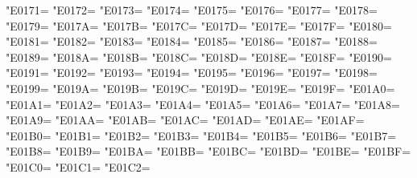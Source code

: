 \XeTeXcharclass"E0171=\KclassCM
\XeTeXcharclass"E0172=\KclassCM
\XeTeXcharclass"E0173=\KclassCM
\XeTeXcharclass"E0174=\KclassCM
\XeTeXcharclass"E0175=\KclassCM
\XeTeXcharclass"E0176=\KclassCM
\XeTeXcharclass"E0177=\KclassCM
\XeTeXcharclass"E0178=\KclassCM
\XeTeXcharclass"E0179=\KclassCM
\XeTeXcharclass"E017A=\KclassCM
\XeTeXcharclass"E017B=\KclassCM
\XeTeXcharclass"E017C=\KclassCM
\XeTeXcharclass"E017D=\KclassCM
\XeTeXcharclass"E017E=\KclassCM
\XeTeXcharclass"E017F=\KclassCM
\XeTeXcharclass"E0180=\KclassCM
\XeTeXcharclass"E0181=\KclassCM
\XeTeXcharclass"E0182=\KclassCM
\XeTeXcharclass"E0183=\KclassCM
\XeTeXcharclass"E0184=\KclassCM
\XeTeXcharclass"E0185=\KclassCM
\XeTeXcharclass"E0186=\KclassCM
\XeTeXcharclass"E0187=\KclassCM
\XeTeXcharclass"E0188=\KclassCM
\XeTeXcharclass"E0189=\KclassCM
\XeTeXcharclass"E018A=\KclassCM
\XeTeXcharclass"E018B=\KclassCM
\XeTeXcharclass"E018C=\KclassCM
\XeTeXcharclass"E018D=\KclassCM
\XeTeXcharclass"E018E=\KclassCM
\XeTeXcharclass"E018F=\KclassCM
\XeTeXcharclass"E0190=\KclassCM
\XeTeXcharclass"E0191=\KclassCM
\XeTeXcharclass"E0192=\KclassCM
\XeTeXcharclass"E0193=\KclassCM
\XeTeXcharclass"E0194=\KclassCM
\XeTeXcharclass"E0195=\KclassCM
\XeTeXcharclass"E0196=\KclassCM
\XeTeXcharclass"E0197=\KclassCM
\XeTeXcharclass"E0198=\KclassCM
\XeTeXcharclass"E0199=\KclassCM
\XeTeXcharclass"E019A=\KclassCM
\XeTeXcharclass"E019B=\KclassCM
\XeTeXcharclass"E019C=\KclassCM
\XeTeXcharclass"E019D=\KclassCM
\XeTeXcharclass"E019E=\KclassCM
\XeTeXcharclass"E019F=\KclassCM
\XeTeXcharclass"E01A0=\KclassCM
\XeTeXcharclass"E01A1=\KclassCM
\XeTeXcharclass"E01A2=\KclassCM
\XeTeXcharclass"E01A3=\KclassCM
\XeTeXcharclass"E01A4=\KclassCM
\XeTeXcharclass"E01A5=\KclassCM
\XeTeXcharclass"E01A6=\KclassCM
\XeTeXcharclass"E01A7=\KclassCM
\XeTeXcharclass"E01A8=\KclassCM
\XeTeXcharclass"E01A9=\KclassCM
\XeTeXcharclass"E01AA=\KclassCM
\XeTeXcharclass"E01AB=\KclassCM
\XeTeXcharclass"E01AC=\KclassCM
\XeTeXcharclass"E01AD=\KclassCM
\XeTeXcharclass"E01AE=\KclassCM
\XeTeXcharclass"E01AF=\KclassCM
\XeTeXcharclass"E01B0=\KclassCM
\XeTeXcharclass"E01B1=\KclassCM
\XeTeXcharclass"E01B2=\KclassCM
\XeTeXcharclass"E01B3=\KclassCM
\XeTeXcharclass"E01B4=\KclassCM
\XeTeXcharclass"E01B5=\KclassCM
\XeTeXcharclass"E01B6=\KclassCM
\XeTeXcharclass"E01B7=\KclassCM
\XeTeXcharclass"E01B8=\KclassCM
\XeTeXcharclass"E01B9=\KclassCM
\XeTeXcharclass"E01BA=\KclassCM
\XeTeXcharclass"E01BB=\KclassCM
\XeTeXcharclass"E01BC=\KclassCM
\XeTeXcharclass"E01BD=\KclassCM
\XeTeXcharclass"E01BE=\KclassCM
\XeTeXcharclass"E01BF=\KclassCM
\XeTeXcharclass"E01C0=\KclassCM
\XeTeXcharclass"E01C1=\KclassCM
\XeTeXcharclass"E01C2=\KclassCM
